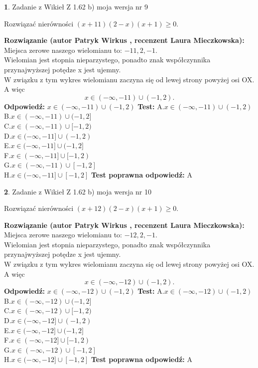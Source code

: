 \documentclass[12pt, a4paper]{article}
\theoremstyle{definition} %
\newtheorem{zad}{}
\newcommand{\zadStart}[1]{\begin{zad}#1\newline}
\newcommand{\zadStop}{\end{zad}}
\newcommand{\rozwStart}[2]{\noindent \textbf{Rozwiązanie (autor #1 , recenzent #2): }\newline}
\newcommand{\rozwStop}{\newline}
\newcommand{\odpStart}{\noindent \textbf{Odpowiedź:}\newline}
\newcommand{\odpStop}{\newline}
\newcommand{\testStart}{\noindent \textbf{Test:}\newline}
\newcommand{\testStop}{\newline}
\newcommand{\kluczStart}{\noindent \textbf{Test poprawna odpowiedź:}\newline}
\newcommand{\kluczStop}{\newline}
\begin{document}
\zadStart{Zadanie z Wikieł Z 1.62 b) moja wersja nr 9}

Rozwiązać nierówności $(x+11)(2-x)(x+1)\ge0$.
\zadStop
\rozwStart{Patryk Wirkus}{Laura Mieczkowska}
Miejsca zerowe naszego wielomianu to: $-11, 2, -1$.\\
Wielomian jest stopnia nieparzystego, ponadto znak współczynnika przy\linebreak najwyższej potędze x jest ujemny.\\ W związku z tym wykres wielomianu zaczyna się od lewej strony powyżej osi OX. A więc $$x \in (-\infty,-11) \cup (-1,2).$$
\rozwStop
\odpStart
$x \in (-\infty,-11) \cup (-1,2)$
\odpStop
\testStart
A.$x \in (-\infty,-11) \cup (-1,2)$\\
B.$x \in (-\infty,-11) \cup (-1,2]$\\
C.$x \in (-\infty,-11) \cup [-1,2)$\\
D.$x \in (-\infty,-11] \cup (-1,2)$\\
E.$x \in (-\infty,-11] \cup (-1,2]$\\
F.$x \in (-\infty,-11] \cup [-1,2)$\\
G.$x \in (-\infty,-11) \cup [-1,2]$\\
H.$x \in (-\infty,-11] \cup [-1,2]$
\testStop
\kluczStart
A
\kluczStop



\zadStart{Zadanie z Wikieł Z 1.62 b) moja wersja nr 10}

Rozwiązać nierówności $(x+12)(2-x)(x+1)\ge0$.
\zadStop
\rozwStart{Patryk Wirkus}{Laura Mieczkowska}
Miejsca zerowe naszego wielomianu to: $-12, 2, -1$.\\
Wielomian jest stopnia nieparzystego, ponadto znak współczynnika przy\linebreak najwyższej potędze x jest ujemny.\\ W związku z tym wykres wielomianu zaczyna się od lewej strony powyżej osi OX. A więc $$x \in (-\infty,-12) \cup (-1,2).$$
\rozwStop
\odpStart
$x \in (-\infty,-12) \cup (-1,2)$
\odpStop
\testStart
A.$x \in (-\infty,-12) \cup (-1,2)$\\
B.$x \in (-\infty,-12) \cup (-1,2]$\\
C.$x \in (-\infty,-12) \cup [-1,2)$\\
D.$x \in (-\infty,-12] \cup (-1,2)$\\
E.$x \in (-\infty,-12] \cup (-1,2]$\\
F.$x \in (-\infty,-12] \cup [-1,2)$\\
G.$x \in (-\infty,-12) \cup [-1,2]$\\
H.$x \in (-\infty,-12] \cup [-1,2]$
\testStop
\kluczStart
A
\kluczStop
\end{document}
